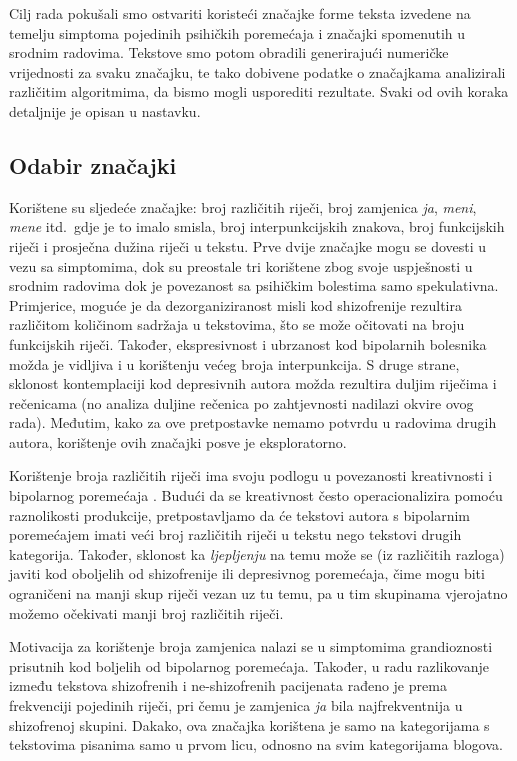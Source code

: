 \documentclass[10pt, a4paper]{article}
\begin{document}
Cilj rada pokušali smo ostvariti koristeći značajke forme teksta izvedene na temelju simptoma pojedinih psihičkih poremećaja i značajki spomenutih u srodnim radovima. Tekstove smo potom obradili generirajući numeričke vrijednosti za svaku značajku, te tako dobivene podatke o značajkama analizirali različitim algoritmima, da bismo mogli usporediti rezultate. Svaki od ovih koraka detaljnije je opisan u nastavku.

\subsection{Odabir značajki}

Korištene su sljedeće značajke: broj različitih riječi, broj zamjenica \emph{ja}, \emph{meni}, \emph{mene} itd.~gdje je to imalo smisla, broj interpunkcijskih znakova, broj funkcijskih riječi i prosječna dužina riječi u tekstu. Prve dvije značajke mogu se dovesti u vezu sa simptomima, dok su preostale tri korištene zbog svoje uspješnosti u srodnim radovima \citep{kristo} dok je povezanost sa psihičkim bolestima samo spekulativna. Primjerice, moguće je da dezorganiziranost misli kod shizofrenije rezultira različitom količinom sadržaja u tekstovima, što se može očitovati na broju funkcijskih riječi. Također, ekspresivnost i ubrzanost kod bipolarnih bolesnika možda je vidljiva i u korištenju većeg broja interpunkcija. S druge strane, sklonost kontemplaciji kod depresivnih autora možda rezultira duljim riječima i rečenicama (no analiza duljine rečenica po zahtjevnosti nadilazi okvire ovog rada). Međutim, kako za ove pretpostavke nemamo potvrdu u radovima drugih autora, korištenje ovih značajki posve je eksploratorno.

Korištenje broja različitih riječi ima svoju podlogu u povezanosti kreativnosti i bipolarnog poremećaja \citep{crea}. Budući da se kreativnost često operacionalizira pomoću raznolikosti produkcije, pretpostavljamo da će tekstovi autora s bipolarnim poremećajem imati veći broj različitih riječi u tekstu nego tekstovi drugih kategorija. Također, sklonost ka \emph{ljepljenju} na temu može se (iz različitih razloga) javiti kod oboljelih od shizofrenije ili depresivnog poremećaja, čime mogu biti ograničeni na manji skup riječi vezan uz tu temu, pa u tim skupinama vjerojatno možemo očekivati manji broj različitih riječi.

Motivacija za korištenje broja zamjenica nalazi se u simptomima grandioznosti prisutnih kod boljelih od bipolarnog poremećaja. Također, u radu \citep{strous-2009} razlikovanje između tekstova shizofrenih i ne-shizofrenih pacijenata rađeno je prema frekvenciji pojedinih riječi, pri čemu je zamjenica \emph{ja} bila najfrekventnija u shizofrenoj skupini. Dakako, ova značajka korištena je samo na kategorijama s tekstovima pisanima samo u prvom licu, odnosno na svim kategorijama blogova.
\end{document}
